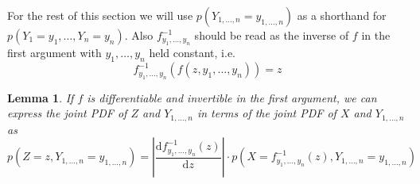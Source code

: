 \documentclass[11pt,a4paper]{book}
\newtheorem{lemma}{Lemma}
\begin{document}
For the rest of this section we will use $p(Y_{1, \dots, n} = y_{1, \dots, n})$
as a shorthand for $p(Y_{1} = y_{1}, \dots, Y_{n} = y_{n})$. Also
$f^{-1}_{y_{1}, \dots, y_{n}}$ should be read as the inverse of $f$ in the first
argument with $y_{1}, \dots, y_{n}$ held constant, i.e.
\begin{equation*}
  f^{-1}_{y_{1}, \dots, y_{n}}(f(z, y_{1}, \dots, y_{n})) = z
\end{equation*}

\begin{lemma}
  \label{lemma:joint-pdf}
  If $f$ is differentiable and invertible in the first argument, we can express
  the joint PDF of $Z$ and $Y_{1, \dots, n}$ in terms of the joint PDF of $X$
  and $Y_{1, \dots, n}$ as
  \begin{equation*}
    p(Z = z, Y_{1, \dots, n} = y_{1, \dots, n}) = \left| \frac{\mathrm{d}f_{y_{1}, \dots, y_{n}}^{-1}(z)}{\mathrm{d}z} \right| \cdot p\left(X = f_{y_{1}, \dots, y_{n}}^{-1}(z), Y_{1, \dots, n} = y_{1, \dots, n}\right)
  \end{equation*}
\end{lemma}
\end{document}
